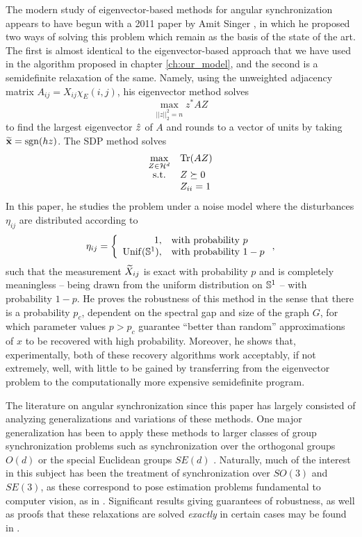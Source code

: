 The modern study of eigenvector-based methods for angular synchronization appears to have begun with a 2011 paper by Amit Singer \cite{singer2011ang_sync}, in which he proposed two ways of solving this problem which remain as the basis of the state of the art.  The first is almost identical to the eigenvector-based approach that we have used in the algorithm proposed in chapter \ref{ch:our_model}, and the second is a semidefinite relaxation of the same.  Namely, using the unweighted adjacency matrix $A_{ij} = X_{ij} \chi_E(i, j)$, his eigenvector method solves \[ \max_{||z||_2^2 = n} z^* A Z \] to find the largest eigenvector $\hat{z}$ of $A$ and rounds to a vector of units by taking $\widetilde{\mathbf{x}} = \operatorname{sgn}(hz)$.  The SDP method solves \begin{equation}\begin{array}{cl} \max\limits_{Z \in \mathcal{H}^d} & \operatorname{Tr}(A Z) \\ \text{s.t.} & Z \succeq 0 \\ & Z_{ii} = 1 \end{array} \label{eq:angsyncSDPsinger}\end{equation}  In this paper, he studies the problem under a noise model where the disturbances $\eta_{ij}$ are distributed according to \[\eta_{ij} = \left\{\begin{array}{r@{,\quad}l} 1 & \text{with probability}\ p \\ \mathrm{Unif}(\Sbb^1) & \text{with probability}\ 1 - p\end{array}\right.,\] such that the measurement $\widetilde{X}_{ij}$ is exact with probability $p$ and is completely meaningless -- being drawn from the uniform distribution on $\mathbb{S}^1$ -- with probability $1 - p$.  He proves the robustness of this method in the sense that there is a probability $p_c$, dependent on the spectral gap and size of the graph $G$, for which parameter values $p > p_c$ guarantee ``better than random'' approximations of $x$ to be recovered with high probability.  Moreover, he shows that, experimentally, both of these recovery algorithms work acceptably, if not extremely, well, with little to be gained by transferring from the eigenvector problem to the computationally more expensive semidefinite program.

The literature on angular synchronization since this paper has largely consisted of analyzing generalizations and variations of these methods.  One major generalization has been to apply these methods to larger classes of group synchronization problems such as synchronization over the orthogonal groups $O(d)$ or the special Euclidean groups $SE(d)$ \cite{Cheeger,briales2017cartan_sync,bandeira2016se_sync}.  Naturally, much of the interest in this subject has been the treatment of synchronization over $SO(3)$ and $SE(3)$, as these correspond to pose estimation problems fundamental to computer vision, as in \cite{enqvist2011nonsequential, olsson2017rot_avg, fischler1981ransac, govindu2006motion_avg}.  Significant results giving guarantees of robustness, as well as proofs that these relaxations are solved \emph{exactly} in certain cases may be found in \cite{alexeev2014phase, bandeira2016tightness, olsson2017rot_avg, bandeira2016se_sync}.

